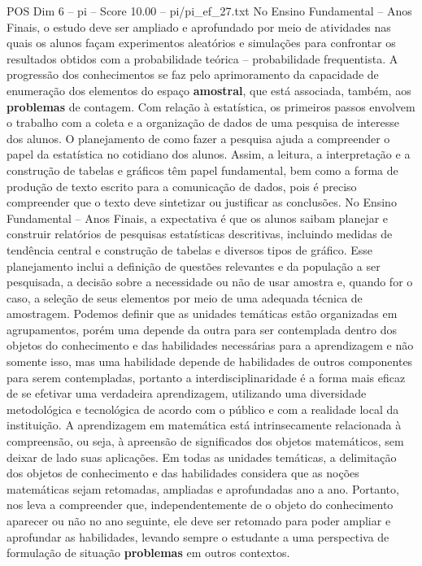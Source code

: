 \begin{textsample}{POS Dim 6 – pi – Score 10.00 – pi/pi\_ef\_27.txt}
No Ensino Fundamental – Anos Finais, o estudo deve ser ampliado e aprofundado por meio de atividades nas quais os alunos façam experimentos aleatórios e simulações para confrontar os resultados obtidos com a probabilidade teórica – probabilidade frequentista.
A progressão dos conhecimentos se faz pelo aprimoramento da capacidade de enumeração dos elementos do espaço \textbf{amostral}, que está associada, também, aos \textbf{problemas} de contagem.
Com relação à estatística, os primeiros passos envolvem o trabalho com a coleta e a organização de dados de uma pesquisa de interesse dos alunos.
O planejamento de como fazer a pesquisa ajuda a compreender o papel da estatística no cotidiano dos alunos.
Assim, a leitura, a interpretação e a construção de tabelas e gráficos têm papel fundamental, bem como a forma de produção de texto escrito para a comunicação de dados, pois é preciso compreender que o texto deve sintetizar ou justificar as conclusões.
No Ensino Fundamental – Anos Finais, a expectativa é que os alunos saibam planejar e construir relatórios de pesquisas estatísticas descritivas, incluindo medidas de tendência central e construção de tabelas e diversos tipos de gráfico.
Esse planejamento inclui a definição de questões relevantes e da população a ser pesquisada, a decisão sobre a necessidade ou não de usar amostra e, quando for o caso, a seleção de seus elementos por meio de uma adequada técnica de amostragem.
Podemos definir que as unidades temáticas estão organizadas em agrupamentos, porém uma depende da outra para ser contemplada dentro dos objetos do conhecimento e das habilidades necessárias para a aprendizagem e não somente isso, mas uma habilidade depende de habilidades de outros componentes para serem contempladas, portanto a interdisciplinaridade é a forma mais eficaz de se efetivar uma verdadeira aprendizagem, utilizando uma diversidade metodológica e tecnológica de acordo com o público e com a realidade local da instituição.
A aprendizagem em matemática está intrinsecamente relacionada à compreensão, ou seja, à apreensão de significados dos objetos matemáticos, sem deixar de lado suas aplicações.
Em todas as unidades temáticas, a delimitação dos objetos de conhecimento e das habilidades considera que as noções matemáticas sejam retomadas, ampliadas e aprofundadas ano a ano.
Portanto, nos leva a compreender que, independentemente de o objeto do conhecimento aparecer ou não no ano seguinte, ele deve ser retomado para poder ampliar e aprofundar as habilidades, levando sempre o estudante a uma perspectiva de formulação de situação \textbf{problemas} em outros contextos.

\end{textsample}
